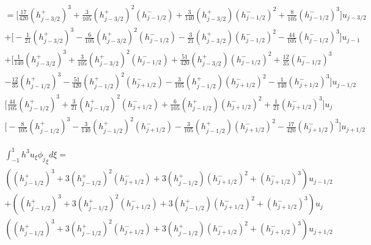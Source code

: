 \documentclass[12pt]{article}
\begin{document}
\begin{multline*}
=\bigg[\frac{17}{420}\left(h^+_{j - 3/2}\right)^3 +  \frac{3}{105} \left(h^+_{j - 3/2}\right)^2 \left(h^-_{j - 1/2}\right)
+ \frac{3}{140} \left(h^+_{j - 3/2}\right) \left(h^-_{j - 1/2}\right)^2 +  \frac{8}{105}\left(h^-_{j - 1/2}\right)^3  \bigg] u_{j - 3/2} \\
+ \bigg[-\frac{1}{21}\left(h^+_{j - 3/2}\right)^3 - \frac{6}{105} \left(h^+_{j - 3/2}\right)^2 \left(h^-_{j - 1/2}\right)
-  \frac{3}{21} \left(h^+_{j - 3/2}\right) \left(h^-_{j - 1/2}\right)^2 - \frac{44}{105}  \left(h^-_{j - 1/2}\right)^3 \bigg] u_{j - 1} \\
+ \bigg[\frac{1}{140}\left(h^+_{j - 3/2}\right)^3 +  \frac{3}{105} \left(h^+_{j - 3/2}\right)^2 \left(h^-_{j - 1/2}\right)
+  \frac{51}{420} \left(h^+_{j - 3/2}\right) \left(h^-_{j - 1/2}\right)^2 +  \frac{12}{35} \left(h^-_{j - 1/2}\right)^3 \\ - \frac{12}{35} \left(h^+_{j - 1/2} \right)^3 - \frac{51}{420}  \left(h^+_{j - 1/2} \right)^2\left(h^-_{j + 1/2}\right) - \frac{3}{105} \left(h^+_{j - 1/2} \right)\left(h^-_{j + 1/2}\right)^2 - \frac{1}{140} \left(h^-_{j + 1/2}\right)^3 \bigg] u_{j - 1/2} \\
\bigg[\frac{44}{105}\left(h^+_{j - 1/2} \right)^3 +  \frac{3}{21}\left(h^+_{j - 1/2} \right)^2\left(h^-_{j + 1/2}\right) +  \frac{6}{105} \left(h^+_{j - 1/2} \right)\left(h^-_{j + 1/2}\right)^2 + \frac{1}{21}\left(h^-_{j + 1/2}\right)^3 \bigg] u_{j}\\
\bigg[ - \frac{8}{105}\left(h^+_{j - 1/2} \right)^3 - \frac{3}{140}  \left(h^+_{j - 1/2} \right)^2\left(h^-_{j + 1/2}\right) - \frac{3}{105} \left(h^+_{j - 1/2} \right)\left(h^-_{j + 1/2}\right)^2  - \frac{17}{420} \left(h^-_{j + 1/2}\right)^3 \bigg] u_{j + 1/2}
\end{multline*}


\begin{multline*}
\int_{-1}^{1}h^3u_{\xi}{\phi_{j}}_\xi d\xi  =  \\\left(\left(h^+_{j - 1/2} \right)^3 + 3 \left(h^+_{j - 1/2} \right)^2\left(h^-_{j + 1/2}\right) + 3 \left(h^+_{j - 1/2} \right)\left(h^-_{j + 1/2}\right)^2 + \left(h^-_{j + 1/2}\right)^3\right)u_{j- 1/2}\\
+ \left(\left(h^+_{j - 1/2} \right)^3 + 3 \left(h^+_{j - 1/2} \right)^2\left(h^-_{j + 1/2}\right) + 3 \left(h^+_{j - 1/2} \right)\left(h^-_{j + 1/2}\right)^2 + \left(h^-_{j + 1/2}\right)^3\right)u_{j}\\
\left(\left(h^+_{j - 1/2} \right)^3 + 3 \left(h^+_{j - 1/2} \right)^2\left(h^-_{j + 1/2}\right) + 3 \left(h^+_{j - 1/2} \right)\left(h^-_{j + 1/2}\right)^2 + \left(h^-_{j + 1/2}\right)^3\right)u_{j+ 1/2}
\end{multline*}
\end{document}
